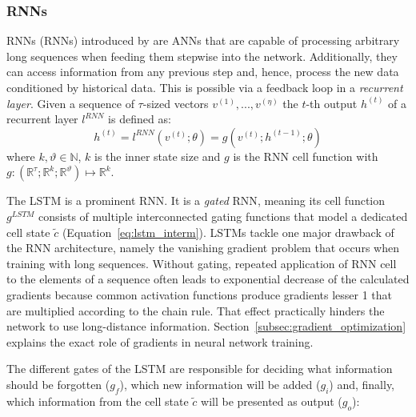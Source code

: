 \subsubsection{\acl{RNN}s} \label{subsec:rnn}
\acl{RNN}s (\acs{RNN}s) introduced by \textcite{hopfield_neural_1982} are \ac{ANN}s that are capable of processing arbitrary long sequences when feeding them stepwise into the network. Additionally, they can access information from any previous step and, hence, process the new data conditioned by historical data. This is possible via a feedback loop in a \textit{recurrent layer}. Given a sequence of $\tau$-sized vectors $v^{(1)}, ..., v^{(\eta)}$ the $t$-th output $h^{(t)}$ of a recurrent layer $l^{RNN}$ is defined as:
\begin{equation} \label{eq:rnn}
h^{(t)} = l^{RNN}(v^{(t)};\theta) = g(v^{(t)}; h^{(t-1)};\theta)
\end{equation}
where $k, \vartheta \in \mathbb{N}$, $k$ is the inner state size and $g$ is the \ac{RNN} cell  function with $g:(\mathbb{R}^\tau; \mathbb{R}^k; \mathbb{R}^\vartheta) \mapsto \mathbb{R}^k$.

The \acf{LSTM} \autocite{hochreiter_long_1997} is a prominent \ac{RNN}. It is a \textit{gated} \ac{RNN}, meaning its cell function $g^{LSTM}$ consists of multiple interconnected gating functions that model a dedicated cell state $\tilde{c}$ (Equation~\ref{eq:lstm_interm}). \ac{LSTM}s tackle one major drawback of the \ac{RNN} architecture, namely the vanishing gradient problem that occurs when training with long sequences. Without gating, repeated application of \ac{RNN} cell  to the elements of a sequence often leads to exponential decrease of the calculated gradients because common activation functions produce gradients lesser 1 that are multiplied according to the chain rule. That effect practically hinders the network to use long-distance information. Section~\ref{subsec:gradient_optimization} explains the exact role of gradients in neural network training.

The different gates  of the \ac{LSTM} are responsible for deciding what information should be forgotten ($g_f$), which new information will be added ($g_i$) and, finally, which information from the cell state $\tilde{c}$ will be presented as output ($g_o$):


